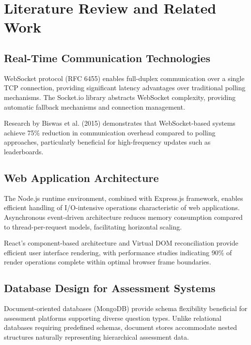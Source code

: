 \documentclass[12pt,a4paper]{report}
\begin{document}

\chapter{Literature Review and Related Work}

\section{Real-Time Communication Technologies}

WebSocket protocol (RFC 6455) enables full-duplex communication over a single TCP connection, providing significant latency advantages over traditional polling mechanisms. The Socket.io library abstracts WebSocket complexity, providing automatic fallback mechanisms and connection management.

Research by Biswas et al. (2015) demonstrates that WebSocket-based systems achieve 75\% reduction in communication overhead compared to polling approaches, particularly beneficial for high-frequency updates such as leaderboards.

\section{Web Application Architecture}

The Node.js runtime environment, combined with Express.js framework, enables efficient handling of I/O-intensive operations characteristic of web applications. Asynchronous event-driven architecture reduces memory consumption compared to thread-per-request models, facilitating horizontal scaling.

React's component-based architecture and Virtual DOM reconciliation provide efficient user interface rendering, with performance studies indicating 90\% of render operations complete within optimal browser frame boundaries.

\section{Database Design for Assessment Systems}

Document-oriented databases (MongoDB) provide schema flexibility beneficial for assessment platforms supporting diverse question types. Unlike relational databases requiring predefined schemas, document stores accommodate nested structures naturally representing hierarchical assessment data.
\end{document}

